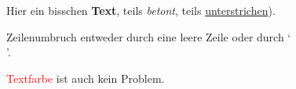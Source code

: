 Hier ein bisschen
\textbf{Text},
teils \emph{betont},
teils \underline
{unterstrichen}).

Zeilenumbruch entweder
durch eine leere Zeile
oder durch `\\'.

\textcolor{red}{Textfarbe}
ist auch kein
{\color{blue} Problem}.

